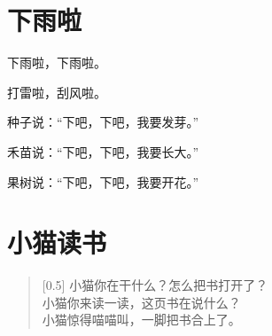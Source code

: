 \documentclass[12pt,UTF-8,openany]{ctexbook}
\begin{document}
\hanzibox{}\hanzibox{}\hanzibox{}\hanzibox{}\hspace{1em}\hanzibox{}\hanzibox{}\hanzibox{}\hanzibox{}

\hanzibox{}\hanzibox{}\hanzibox{}\hanzibox{}\hspace{1em}




\chapter{下雨啦}

\begin{large}
    
    下雨啦，下雨啦。
    
    打雷啦，刮风啦。
    
    种子说：“下吧，下吧，我要发芽。”
    
    禾苗说：“下吧，下吧，我要长大。”
    
    果树说：“下吧，下吧，我要开花。”
    
\end{large}


\clearpage

\begin{center}
    
\end{center}


\hanzibox{}\hanzibox{}\hanzibox{}\hanzibox{}\hspace{1em}\hanzibox{}\hanzibox{}\hanzibox{}\hanzibox{}

\hanzibox{}\hanzibox{}\hanzibox{}\hanzibox{}\hspace{1em}\hanzibox{}\hanzibox{}\hanzibox{}\hanzibox{}

\hanzibox{}\hanzibox{}\hanzibox{}\hanzibox{}\hspace{1em}\hanzibox{}\hanzibox{}\hanzibox{}\hanzibox{}






\chapter{小猫读书}

\begin{large}
    
    \begin{verse}[0.5\linewidth]
        小猫你在干什么？怎么把书打开了？ \\
        小猫你来读一读，这页书在说什么？ \\
        小猫惊得喵喵叫，一脚把书合上了。
    \end{verse}
    
\end{large}
\end{document}
